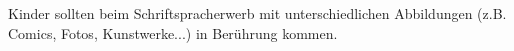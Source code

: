 Kinder sollten beim Schriftspracherwerb mit unterschiedlichen Abbildungen (z.B. Comics, Fotos, Kunstwerke...) in Berührung kommen.